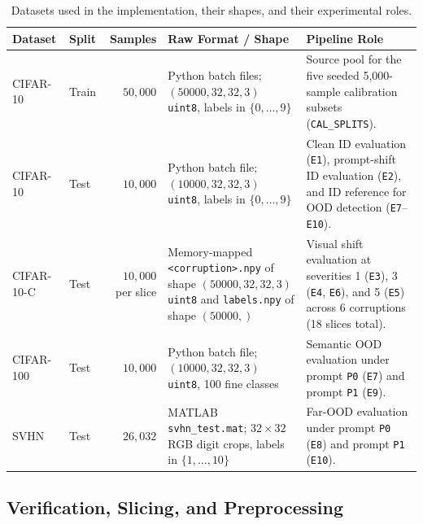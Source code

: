 \documentclass[11pt,a4paper]{article}
\begin{document}
\begin{table}[!htbp]
\centering
\caption{Datasets used in the implementation, their shapes, and their experimental roles.}
\label{tab:datasets}
\begin{tabularx}{\textwidth}{L{0.12\textwidth} L{0.07\textwidth} r L{0.28\textwidth} Y}
\toprule
\textbf{Dataset} & \textbf{Split} & \textbf{Samples} & \textbf{Raw Format / Shape} & \textbf{Pipeline Role} \\
\midrule
CIFAR-10 & Train & $50,000$ & Python batch files; $(50000, 32, 32, 3)$ \texttt{uint8}, labels in $\{0,\dots,9\}$ & Source pool for the five seeded 5,000-sample calibration subsets (\texttt{CAL\_\allowbreak{}SPLITS}). \\
CIFAR-10 & Test & $10,000$ & Python batch file; $(10000, 32, 32, 3)$ \texttt{uint8}, labels in $\{0,\dots,9\}$ & Clean ID evaluation (\texttt{E1}), prompt-shift ID evaluation (\texttt{E2}), and ID reference for OOD detection (\texttt{E7}--\texttt{E10}). \\
CIFAR-10-C & Test & $10,000$ per slice & Memory-mapped \texttt{<corruption>.\allowbreak{}npy} of shape $(50000, 32, 32, 3)$ \texttt{uint8} and \texttt{labels.\allowbreak{}npy} of shape $(50000,)$ & Visual shift evaluation at severities 1 (\texttt{E3}), 3 (\texttt{E4}, \texttt{E6}), and 5 (\texttt{E5}) across 6 corruptions (18 slices total). \\
CIFAR-100 & Test & $10,000$ & Python batch file; $(10000, 32, 32, 3)$ \texttt{uint8}, 100 fine classes & Semantic OOD evaluation under prompt \texttt{P0} (\texttt{E7}) and prompt \texttt{P1} (\texttt{E9}). \\
SVHN & Test & $26,032$ & MATLAB \texttt{svhn\_\allowbreak{}test.\allowbreak{}mat}; $32 \times 32$ RGB digit crops, labels in $\{1,\dots,10\}$ & Far-OOD evaluation under prompt \texttt{P0} (\texttt{E8}) and prompt \texttt{P1} (\texttt{E10}). \\
\bottomrule
\end{tabularx}
\end{table}

\subsection{Verification, Slicing, and Preprocessing}
\end{document}

